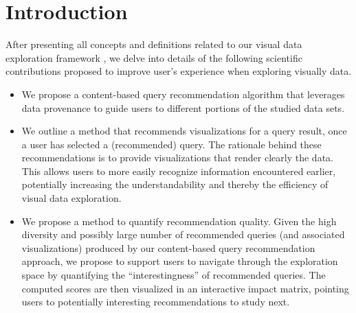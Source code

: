 \section{Introduction}
\label{sec:intro}

After presenting all concepts and definitions related to our visual data exploration framework {\color{Fuchsia}\framework{}}, we delve into details of the following scientific contributions proposed to improve user's experience when exploring visually data.

\begin{itemize}



\item We propose a content-based query recommendation algorithm that leverages data provenance to guide users to different portions of the studied data sets. 


\item We outline a method that recommends visualizations for a query result, once a user has selected a (recommended) query. The rationale behind these recommendations is to provide visualizations that render clearly the data.  This allows users to more easily recognize information encountered earlier, potentially increasing the understandability and thereby the efficiency of visual data exploration.

\item  We propose a method to quantify recommendation quality.  Given the high diversity and possibly large number of recommended queries (and associated visualizations) produced by our content-based query recommendation approach, we propose to support users to navigate through the exploration space by quantifying the ``interestingness'' of recommended queries. The computed scores are then visualized in an interactive impact matrix, pointing users to potentially interesting recommendations to study next.

% 
%

\end{itemize}
